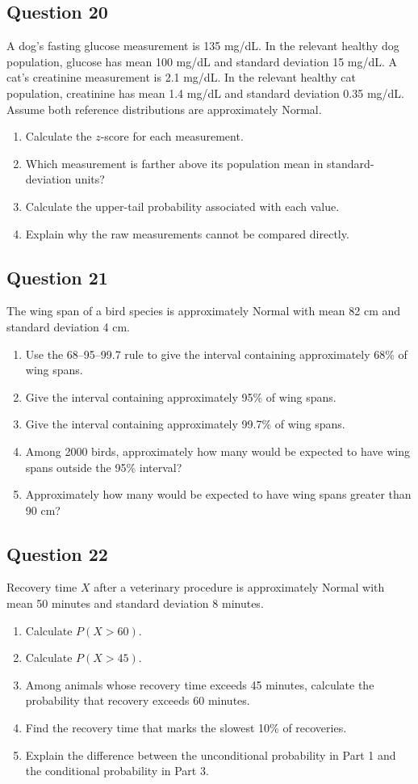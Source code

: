 \documentclass[10pt,letterpaper]{article}
\newcommand{\questionheading}[1]{%
  \subsection*{Question #1}
}
\begin{document}
\questionheading{20}
A dog's fasting glucose measurement is 135 mg/dL. In the relevant healthy dog population, glucose has mean 100 mg/dL and standard deviation 15 mg/dL. A cat's creatinine measurement is 2.1 mg/dL. In the relevant healthy cat population, creatinine has mean 1.4 mg/dL and standard deviation 0.35 mg/dL. Assume both reference distributions are approximately Normal.
\begin{enumerate}
\item Calculate the $z$-score for each measurement.
\item Which measurement is farther above its population mean in standard-deviation units?
\item Calculate the upper-tail probability associated with each value.
\item Explain why the raw measurements cannot be compared directly.
\end{enumerate}

\newpage

\questionheading{21}
The wing span of a bird species is approximately Normal with mean 82 cm and standard deviation 4 cm.
\begin{enumerate}
	\item Use the 68--95--99.7 rule to give the interval containing approximately 68\% of wing spans.
	\item Give the interval containing approximately 95\% of wing spans.
	\item Give the interval containing approximately 99.7\% of wing spans.
	\item Among 2000 birds, approximately how many would be expected to have wing spans outside the 95\% interval?
	\item Approximately how many would be expected to have wing spans greater than 90 cm?
\end{enumerate}

\questionheading{22}
Recovery time $X$ after a veterinary procedure is approximately Normal with mean 50 minutes and standard deviation 8 minutes.
\begin{enumerate}
	\item Calculate $P(X>60)$.
	\item Calculate $P(X>45)$.
	\item Among animals whose recovery time exceeds 45 minutes, calculate the probability that recovery exceeds 60 minutes.
	\item Find the recovery time that marks the slowest 10\% of recoveries.
	\item Explain the difference between the unconditional probability in Part 1 and the conditional probability in Part 3.
\end{enumerate}
\end{document}
